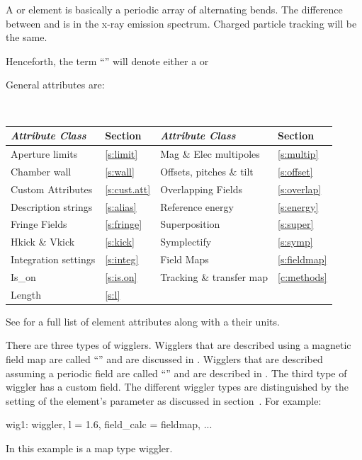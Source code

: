 {A  or  element is basically a periodic array of alternating bends.
The difference between  and  is in the x-ray emission spectrum.
Charged particle tracking will be the same. 

Henceforth, the term ``'' will denote either a  or 

General  attributes are:
\begin{center}
\tt
\begin{tabular}{llll} \toprule
  {\sl Attribute Class}      & Section           & {\sl Attribute Class}      & Section            \\ \midrule
  Aperture limits            & \ref{s:limit}     & Mag \& Elec multipoles     & \ref{s:multip}     \\
  Chamber wall               & \ref{s:wall}      & Offsets, pitches \& tilt   & \ref{s:offset}     \\
  Custom Attributes          & \ref{s:cust.att}  & Overlapping Fields         & \ref{s:overlap}    \\
  Description strings        & \ref{s:alias}     & Reference energy           & \ref{s:energy}     \\ 
  Fringe Fields              & \ref{s:fringe}    & Superposition              & \ref{s:super}      \\
  Hkick \& Vkick             & \ref{s:kick}      & Symplectify                & \ref{s:symp}       \\
  Integration settings       & \ref{s:integ}     & Field Maps                 & \ref{s:fieldmap}   \\
  Is_on                      & \ref{s:is.on}     & Tracking \& transfer map   & \ref{c:methods}    \\ 
  Length                     & \ref{s:l}         &                            &                    \\ 
  \bottomrule
\end{tabular}
\end{center}
\toffset
See  for a full list of element attributes along with a their units.

There are three types of wigglers. Wigglers that are described using a magnetic field map are called
``'' and are discussed in . Wigglers that are described
assuming a periodic field are called ``'' and are described in
. The third type of wiggler has a custom field. The different wiggler types
are distinguished by the setting of the element's  parameter as discussed in
section~. For example:
\begin{example}
  wig1: wiggler, l = 1.6, field_calc = fieldmap, ...
\end{example}
In this example  is a map type wiggler. 

}
